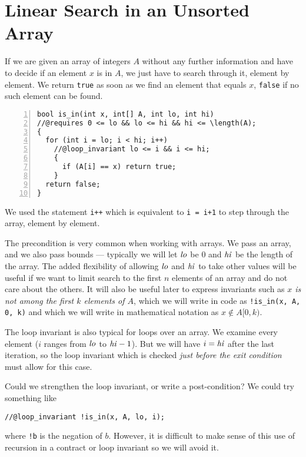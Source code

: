 \section{Linear Search in an Unsorted Array}
\label{sec:linsearch:linear}

If we are given an array of integers $A$ without any further
information and have to decide if an element $x$ is in $A$, we just
have to search through it, element by element.  We return \lstinline'true'
as soon as we find an element that equals $x$, \lstinline'false' if no
such element can be found.
\begin{lstlisting}[language={[C0]C}, numbers=left]
bool is_in(int x, int[] A, int lo, int hi)
//@requires 0 <= lo && lo <= hi && hi <= \length(A);
{
  for (int i = lo; i < hi; i++)
    //@loop_invariant lo <= i && i <= hi;
    {
      if (A[i] == x) return true;
    }
  return false;
}
\end{lstlisting}

\noindent
We used the statement \lstinline'i++' which is equivalent
to \lstinline'i = i+1' to step through the array, element by element.

The precondition is very common when working with arrays. We pass an
array, and we also pass bounds --- typically we will let ${\it lo}$
be 0 and ${\it hi}$ be the length of the array. The added
flexibility of allowing ${\it lo}$ and ${\it hi}$ to take other
values will be useful if we want to limit search to the first $n$
elements of an array and do not care about the others. It will also be
useful later to express invariants such as \emph{$x$ is not among the
  first $k$ elements of $A$}, which we will write in code as
\lstinline'!is_in(x, A, 0, k)' and which we will write in mathematical
notation as $x \notin A\lbrack 0,k)$.

The loop invariant is also typical for loops over an array.  We
examine every element ($i$ ranges from ${\it lo}$ to ${\it
  hi}-1$).  But we will have $i = {\it hi}$ after the last
iteration, so the loop invariant which is checked \emph{just before
  the exit condition} must allow for this case.

Could we strengthen the loop invariant, or write a post-condition?
We could try something like
\begin{lstlisting}[language={[C0]C}]
//@loop_invariant !is_in(x, A, lo, i);
\end{lstlisting}
where \lstinline'!b' is the negation of $b$.  However, it is difficult to
make sense of this use of recursion in a contract or loop invariant
so we will avoid it.

